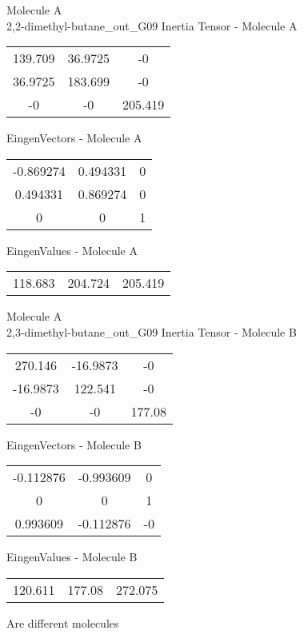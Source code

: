 \begin{multicols}{2}
\begin{center}
Molecule A \\ 
2,2-dimethyl-butane_out_G09
Inertia Tensor - Molecule A \\
\vtab
\begin{tabular}{|c c c|}
139.709	 & 	36.9725	 & 	-0	 \\
36.9725	 & 	183.699	 & 	-0	 \\
-0	 & 	-0	 & 	205.419
\end{tabular}

\vtab
 EingenVectors - Molecule A     \\
\vtab
\begin{tabular}{|c c c|}
-0.869274	 & 	0.494331	 & 	0	 \\
0.494331	 & 	0.869274	 & 	0	 \\
0	 & 	0	 & 	1
\end{tabular}

\vtab
 EingenValues - Molecule A     \\
\vtab
\begin{tabular}{|c c c|}
118.683	 & 	204.724	 & 	205.419
\end{tabular}
\columnbreak
Molecule A \\ 
2,3-dimethyl-butane_out_G09
Inertia Tensor - Molecule B \\
\vtab
\begin{tabular}{|c c c|}
270.146	 & 	-16.9873	 & 	-0	 \\
-16.9873	 & 	122.541	 & 	-0	 \\
-0	 & 	-0	 & 	177.08
\end{tabular}

\vtab
 EingenVectors - Molecule B     \\
\vtab
\begin{tabular}{|c c c|}
-0.112876	 & 	-0.993609	 & 	0	 \\
0	 & 	0	 & 	1	 \\
0.993609	 & 	-0.112876	 & 	-0
\end{tabular}

\vtab
 EingenValues - Molecule B     \\
\vtab
\begin{tabular}{|c c c|}
120.611	 & 	177.08	 & 	272.075
\end{tabular}
\textcolor{NavyBlue}{\large Are different molecules}
\end{center}
\end{multicols}
